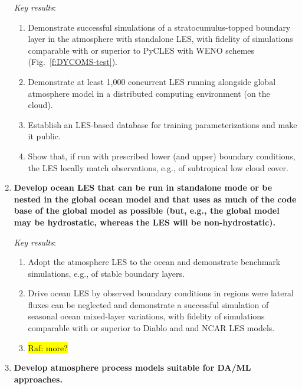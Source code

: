 \documentclass{article}
\begin{document}
\begin{enumerate}
    \emph{Key results}:
    \begin{enumerate}
        \item Demonstrate successful simulations of a stratocumulus-topped boundary layer in the atmosphere with standalone LES, with fidelity of simulations comparable with or superior to PyCLES with WENO schemes (Fig.~\ref{f:DYCOMS-test}). 
        \item Demonstrate at least 1,000 concurrent LES running alongside global atmosphere model in a distributed computing environment (on the cloud).
        \item Establish an LES-based database for training parameterizations and make it public.
        \item Show that, if run with prescribed lower (and upper) boundary conditions, the LES locally match observations, e.g., of subtropical low cloud cover. 
    \end{enumerate}
   
   \item \textbf{Develop ocean LES that can be run in standalone mode or be nested in the global ocean model and that uses as much of the code base of the global model as possible (but, e.g., the global model may be hydrostatic, whereas the LES will be non-hydrostatic).}
 
    \emph{Key results}: 
    \begin{enumerate}
    \item Adopt the atmosphere LES to the ocean and demonstrate benchmark simulations, e.g., of stable boundary layers. 
    \item Drive ocean LES by observed boundary conditions in regions were lateral fluxes can be neglected and demonstrate a successful simulation of seasonal ocean mixed-layer variations,  with fidelity of simulations comparable with or superior to Diablo and and NCAR LES models.
    \item \hl{Raf: more?}
\end{enumerate}
   
    \item \textbf{Develop atmosphere process models suitable for DA/ML approaches.}
    

\end{enumerate}
\end{document}
